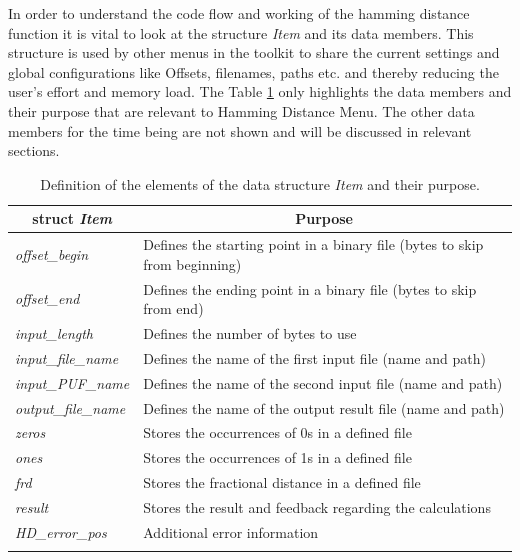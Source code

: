 In order to understand the code flow and working of the hamming distance function it is vital to look at the structure \emph{Item} and its data members. This structure is used by other menus in the toolkit to share the current settings and global configurations like Offsets, filenames, paths etc. and thereby reducing the user's effort and memory load. The Table \ref{table:item} only highlights the data members and their purpose that are relevant to Hamming Distance Menu. The other data members
for the time being are not shown and will be discussed in relevant sections.\\

\begin{table}[!ht]
	\begin{center}
		\begin{tabular}{ll}
			\toprule
			\multicolumn{1}{c}{\textbf{struct \emph{Item}}} & \multicolumn{1}{c}{\textbf{Purpose}}\\
			\midrule
			\hline

			\emph{offset\_begin} & Defines the starting point in a binary file (bytes to skip from beginning)\\

			\emph{offset\_end} & Defines the ending point in a binary file (bytes to skip from end)\\

			\emph{input\_length} & Defines the number of bytes to use \\

			\emph{input\_file\_name} & Defines the name of the first input file (name and path)\\

			\emph{input\_PUF\_name} & Defines the name of the second input file (name and path)\\

			\emph{output\_file\_name} & Defines the name of the output result file (name and path)\\

			\emph{zeros} & Stores the occurrences of 0s in a defined file\\

			\emph{ones} & Stores the occurrences of 1s in a defined file\\

			\emph{frd} & Stores the fractional distance in a defined file\\

			\emph{result} & Stores the result and feedback regarding the calculations\\

			\emph{HD\_error\_pos} & Additional error information \\

			\hline
			\addlinespace
			\bottomrule
		\end{tabular}
	\end{center}
	\caption{Definition of the elements of the data structure \emph{Item} and their purpose.}
	\label{table:item}
\end{table}

